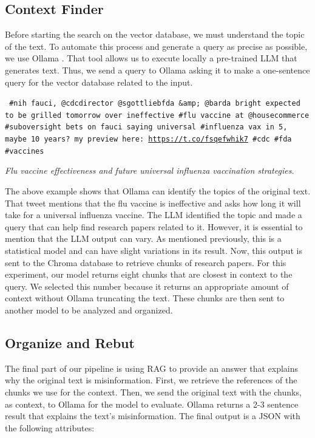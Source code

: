 \subsection{Context Finder}
Before starting the search on the vector database, we must understand the topic of the text. To automate this process and generate a query as precise as possible, we use Ollama \cite{ollama}. That tool allows us to execute locally a pre-trained LLM that generates text. Thus, we send a query to Ollama asking it to make a one-sentence query for the vector database related to the input.

 
 \begin{tcolorbox}[colback=gray!10, colframe=black!70, title=Input]
\texttt{%
\#nih fauci, @cdcdirector @sgottliebfda \&amp; @barda bright expected to be grilled tomorrow over ineffective \#flu vaccine at @housecommerce \#suboversight bets on fauci saying universal \#influenza vax in 5, maybe 10 years? my preview here: \url{https://t.co/fsqefwhik7} \#cdc \#fda \#vaccines%
}
\end{tcolorbox}

\begin{tcolorbox}[colback=white, colframe=black!70, title=Output]
\textit{%
Flu vaccine effectiveness and future universal influenza vaccination strategies.%
}
\end{tcolorbox}
 
The above example shows that Ollama can identify the topics of the original text. That tweet mentions that the flu vaccine is ineffective and asks how long it will take for a universal influenza vaccine. The LLM identified the topic and made a query that can help find
research papers related to it. However, it is essential to mention that the LLM output can vary. As mentioned previously, this is a statistical model and can have slight variations in its result. Now, this output is sent to the Chroma database to retrieve chunks of research
papers. For this experiment, our model returns eight chunks that are closest in context to the query. We selected this number because it returns an appropriate amount of context without Ollama truncating the text. These chunks are then sent to another model to be analyzed and organized.

\subsection{Organize and Rebut}
The final part of our pipeline is using RAG to provide an answer that explains why the original text is misinformation. First, we retrieve the references of the chunks we use for the context. Then, we send the original text with the chunks, as context, to Ollama for
the model to evaluate. Ollama returns a 2-3 sentence result that explains the text’s misinformation. The final output is a JSON with the following attributes:

